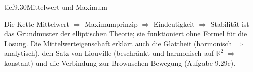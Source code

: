 \begin{loesungkarte}{tief}{9.30}{Mittelwert und Maximum}
\begin{mitnehmen}\kastentext
Die Kette Mittelwert $\Rightarrow$ Maximumprinzip $\Rightarrow$ Eindeutigkeit $\Rightarrow$ Stabilität ist das Grundmuster der elliptischen Theorie; sie funktioniert ohne Formel für die Lösung. Die Mittelwerteigenschaft erklärt auch die Glattheit (harmonisch $\Rightarrow$ analytisch), den Satz von Liouville (beschränkt und harmonisch auf $\mathbb R^{2}$ $\Rightarrow$ konstant) und die Verbindung zur Brownschen Bewegung (Aufgabe 9.29c).
\end{mitnehmen}
\end{loesungkarte}

